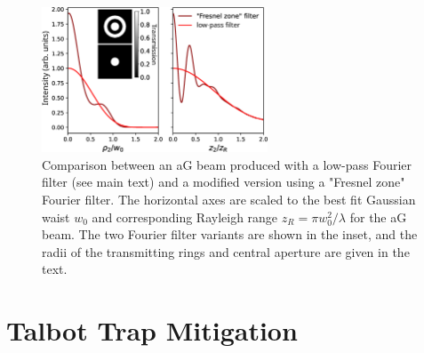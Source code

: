 \begin{figure}[!ht]
    \centering
    \includegraphics[width=0.6\textwidth]{Images/figure6.eps}
    \caption{Comparison between an aG beam produced with a low-pass Fourier filter (see main text) and a modified version using a "Fresnel zone" Fourier filter. The horizontal axes are scaled to the best fit Gaussian waist $w_0$ and corresponding Rayleigh range $z_R=\pi w_0^2/\lambda$ for the aG beam. The two Fourier filter variants are shown in the inset, and the radii of the transmitting rings and central aperture are given in the text.}
    \label{fig:zonefilter}
\end{figure}

\section{Talbot Trap Mitigation}\label{sec:talbot}

